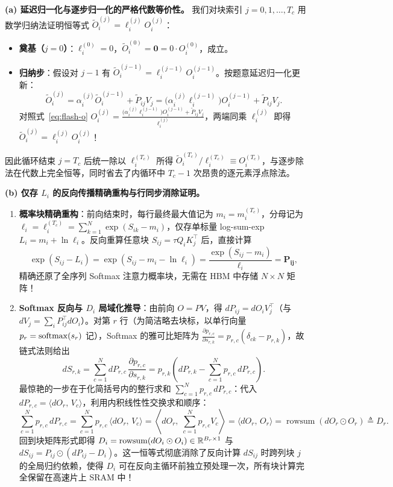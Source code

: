 \textbf{(a) 延迟归一化与逐步归一化的严格代数等价性。} 我们对块索引 $j = 0, 1, \dots, T_c$ 用数学归纳法证明恒等式 $\tilde{O}_i^{(j)} = \ell_i^{(j)} O_i^{(j)}$：
\begin{itemize}
  \item \textbf{奠基（$j = 0$）}：$\ell_i^{(0)} = 0$，$\tilde{O}_i^{(0)} = \mathbf{0} = 0 \cdot O_i^{(0)}$，成立。
  \item \textbf{归纳步}：假设对 $j - 1$ 有 $\tilde{O}_i^{(j-1)} = \ell_i^{(j-1)} O_i^{(j-1)}$。按题意延迟归一化更新：
  \[
    \tilde{O}_i^{(j)} = \alpha_i^{(j)} \tilde{O}_i^{(j-1)} + \tilde{P}_{ij} V_j
    = \Big(\alpha_i^{(j)} \ell_i^{(j-1)}\Big) O_i^{(j-1)} + \tilde{P}_{ij} V_j.
  \]
  对照式~\eqref{eq:flash-o} $O_i^{(j)} = \frac{\big(\alpha_i^{(j)} \ell_i^{(j-1)}\big) O_i^{(j-1)} + \tilde{P}_{ij} V_j}{\ell_i^{(j)}}$，两端同乘 $\ell_i^{(j)}$ 即得 $\tilde{O}_i^{(j)} = \ell_i^{(j)} O_i^{(j)}$！
\end{itemize}
因此循环结束 $j = T_c$ 后统一除以 $\ell_i^{(T_c)}$ 所得 $\tilde{O}_i^{(T_c)} / \ell_i^{(T_c)} \equiv O_i^{(T_c)}$，与逐步除法在代数上完全恒等，同时省去了内循环中 $T_c - 1$ 次昂贵的逐元素浮点除法。

\textbf{(b) 仅存 $L_i$ 的反向传播精确重构与行同步消除证明。}
\begin{enumerate}
  \item \textbf{概率块精确重构}：前向结束时，每行最终最大值记为 $m_i = m_i^{(T_c)}$，分母记为 $\ell_i = \ell_i^{(T_c)} = \sum_{k=1}^N \exp(S_{ik} - m_i)$，仅存单标量 log-sum-exp $L_i = m_i + \ln \ell_i$。反向重算任意块 $S_{ij} = \tau Q_i K_j^\top$ 后，直接计算
  \[
    \exp(S_{ij} - L_i) = \exp(S_{ij} - m_i - \ln \ell_i) = \frac{\exp(S_{ij} - m_i)}{\ell_i} = \mathbf{P_{ij}},
  \]
  精确还原了全序列 Softmax 注意力概率块，无需在 HBM 中存储 $N \times N$ 矩阵！
  \item \textbf{Softmax 反向与 $D_i$ 局域化推导}：由前向 $O = P V$，得 $dP_{ij} = dO_i V_j^\top$（与 $dV_j = \sum_i P_{ij}^\top dO_i$）。对第 $r$ 行（为简洁略去块标，以单行向量 $p_r = \operatorname{softmax}(s_r)$ 记），Softmax 的雅可比矩阵为 $\frac{\partial p_{r,c}}{\partial s_{r,k}} = p_{r,c}(\delta_{ck} - p_{r,k})$，故链式法则给出
  \[
    dS_{r,k} = \sum_{c=1}^N dP_{r,c}\,\frac{\partial p_{r,c}}{\partial s_{r,k}}
    = p_{r,k}\!\left(dP_{r,k} - \sum_{c=1}^N p_{r,c}\,dP_{r,c}\right).
  \]
  最惊艳的一步在于化简括号内的整行求和 $\sum_{c=1}^N p_{r,c}\,dP_{r,c}$：代入 $dP_{r,c} = \langle dO_r,\, V_c \rangle$，利用内积线性性交换求和顺序：
  \[
    \sum_{c=1}^N p_{r,c}\,dP_{r,c}
    = \sum_{c=1}^N p_{r,c}\,\langle dO_r,\, V_c \rangle
    = \left\langle dO_r,\; \sum_{c=1}^N p_{r,c} V_c \right\rangle
    = \langle dO_r,\, O_r \rangle = \operatorname{rowsum}(dO_r \odot O_r) \triangleq D_r.
  \]
  回到块矩阵形式即得 $D_i = \operatorname{rowsum}(dO_i \odot O_i) \in \mathbb{R}^{B_r \times 1}$ 与 $dS_{ij} = P_{ij} \odot (dP_{ij} - D_i)$。这一恒等式彻底消除了反向计算 $dS_{ij}$ 时跨列块 $j$ 的全局归约依赖，使得 $D_i$ 可在反向主循环前独立预处理一次，所有块计算完全保留在高速片上 SRAM 中！
\end{enumerate}

